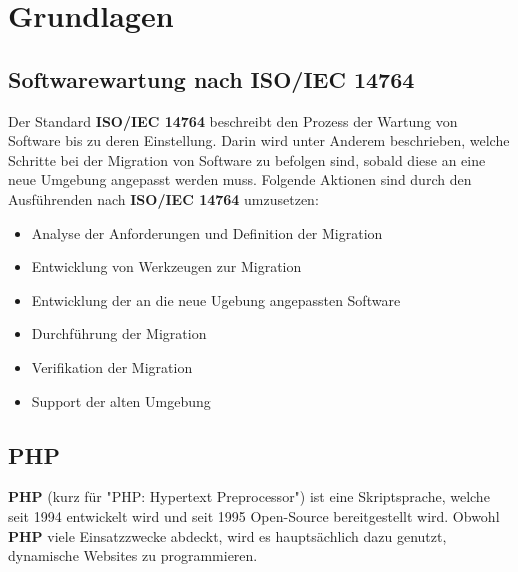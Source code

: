 \chapter{Grundlagen}\label{ch:grundlagen}

\section{Softwarewartung nach ISO/IEC 14764}
Der Standard \textbf{ISO/IEC 14764} beschreibt den Prozess der Wartung von Software bis zu deren Einstellung.
Darin wird unter Anderem beschrieben, welche Schritte bei der Migration von Software zu befolgen sind, sobald diese an eine neue Umgebung angepasst werden muss.
Folgende Aktionen sind durch den Ausführenden nach \textbf{ISO/IEC 14764} umzusetzen:
\begin{itemize}
    \item Analyse der Anforderungen und Definition der Migration
    \item Entwicklung von Werkzeugen zur Migration
    \item Entwicklung der an die neue Ugebung angepassten Software
    \item Durchführung der Migration
    \item Verifikation der Migration
    \item Support der alten Umgebung
\end{itemize}

\section{PHP}
\textbf{PHP} (kurz für "PHP: Hypertext Preprocessor") ist eine Skriptsprache, welche seit 1994 entwickelt wird und seit 1995 Open-Source bereitgestellt wird.
Obwohl \textbf{PHP} viele Einsatzzwecke abdeckt, wird es hauptsächlich dazu genutzt, dynamische Websites zu programmieren.
